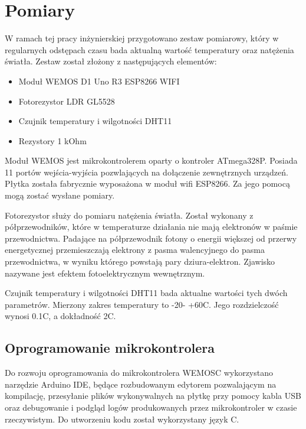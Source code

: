 \newpage
\section{Pomiary}

W ramach tej pracy inżynierskiej przygotowano zestaw pomiarowy, który 
w regularnych odstępach czasu bada aktualną wartość temperatury oraz
natężenia światła. Zestaw został złożony z następujących elementów:

\begin{itemize} %
    \item Moduł WEMOS D1 Uno R3 ESP8266 WIFI
    \item Fotorezystor LDR GL5528
    \item Czujnik temperatury i wilgotności DHT11
    \item Rezystory 1 kOhm
\end{itemize}

Moduł WEMOS jest mikrokontrolerem oparty o kontroler ATmega328P. Posiada
11 portów wejścia-wyjścia pozwlających na dołączenie zewnętrznych 
urządzeń. Płytka została fabrycznie wyposażona w moduł wifi ESP8266. Za
jego pomocą mogą zostać wysłane pomiary.

Fotorezystor służy do pomiaru natężenia światła. Został wykonany 
z półprzewodników, które w temperaturze działania nie mają elektronów 
w paśmie przewodnictwa. Padające na półprzewodnik fotony o energii 
większej od przerwy energetycznej przemieszczają elektrony z pasma 
walencyjnego do pasma przewodnictwa, w wyniku którego powstają pary 
dziura-elektron. Zjawisko nazywane jest efektem fotoelektrycznym 
wewnętrznym.

Czujnik temperatury i wilgotności DHT11 bada aktualne wartości tych
dwóch parametrów. Mierzony zakres temperatury to -20\degree  - +60\degree C.
Jego rozdzielczość wynosi 0.1\degree C, a dokładność 2\degree C.

\subsection{Oprogramowanie mikrokontrolera}

Do rozwoju oprogramowania do mikrokontrolera WEMOSC wykorzystano narzędzie 
Arduino IDE, będące rozbudowanym edytorem pozwalającym na kompilację,
przesyłanie plików wykonywalnych na płytkę przy pomocy kabla USB oraz
debugowanie i podgląd logów produkowanych przez mikrokontroler w czasie 
rzeczywistym. Do utworzeniu kodu został wykorzystany język C.

